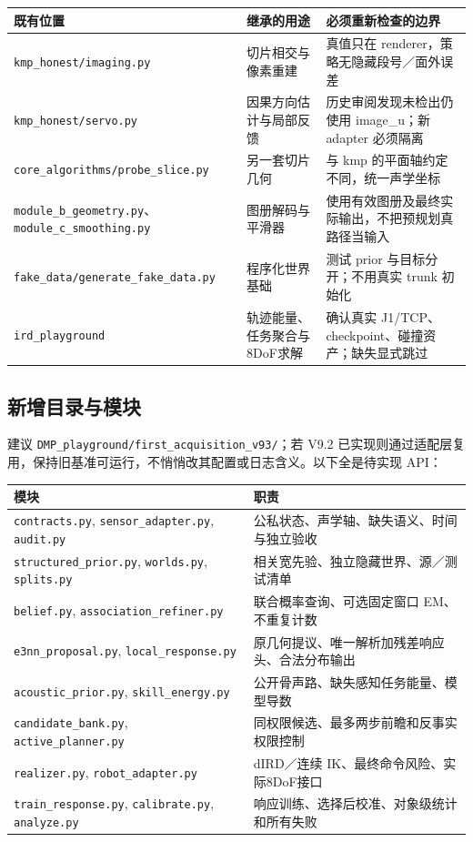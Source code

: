 \documentclass[UTF8,fontset=fandol,11pt,a4paper]{ctexart}
\theoremstyle{plain}
\theoremstyle{definition}
\theoremstyle{remark}
\numberwithin{equation}{section}
\newcommand{\code}[1]{\begingroup\small\nolinkurl{#1}\endgroup}
\begin{document}
\begin{longtable}{P{46mm}P{47mm}P{53mm}}
\toprule 既有位置 & 继承的用途 & 必须重新检查的边界\\\midrule\endhead
\code{kmp_honest/imaging.py} & 切片相交与像素重建 & 真值只在 renderer，策略无隐藏段号／面外误差\\
\code{kmp_honest/servo.py} & 因果方向估计与局部反馈 & 历史审阅发现未检出仍使用 image\_u；新 adapter 必须隔离\\
\code{core_algorithms/probe_slice.py} & 另一套切片几何 & 与 kmp 的平面轴约定不同，统一声学坐标\\
\code{module_b_geometry.py}、\code{module_c_smoothing.py} & 图册解码与平滑器 & 使用有效图册及最终实际输出，不把预规划真路径当输入\\
\code{fake_data/generate_fake_data.py} & 程序化世界基础 & 测试 prior 与目标分开；不用真实 trunk 初始化\\
\code{ird_playground} & 轨迹能量、任务聚合与8DoF求解 & 确认真实 J1/TCP、checkpoint、碰撞资产；缺失显式跳过\\\bottomrule
\end{longtable}

\subsection{新增目录与模块}
建议 \code{DMP_playground/first_acquisition_v93/}；若 V9.2 已实现则通过适配层复用，保持旧基准可运行，不悄悄改其配置或日志含义。以下全是待实现 API：
\begin{longtable}{P{44mm}P{102mm}}
\toprule 模块 & 职责\\\midrule\endhead
\code{contracts.py}, \code{sensor_adapter.py}, \code{audit.py} & 公私状态、声学轴、缺失语义、时间与独立验收\\
\code{structured_prior.py}, \code{worlds.py}, \code{splits.py} & 相关宽先验、独立隐藏世界、源／测试清单\\
\code{belief.py}, \code{association_refiner.py} & 联合概率查询、可选固定窗口 EM、不重复计数\\
\code{e3nn_proposal.py}, \code{local_response.py} & 原几何提议、唯一解析加残差响应头、合法分布输出\\
\code{acoustic_prior.py}, \code{skill_energy.py} & 公开骨声路、缺失感知任务能量、模型导数\\
\code{candidate_bank.py}, \code{active_planner.py} & 同权限候选、最多两步前瞻和反事实权限控制\\
\code{realizer.py}, \code{robot_adapter.py} & dIRD／连续 IK、最终命令风险、实际8DoF接口\\
\code{train_response.py}, \code{calibrate.py}, \code{analyze.py} & 响应训练、选择后校准、对象级统计和所有失败\\\bottomrule
\end{longtable}
\end{document}
